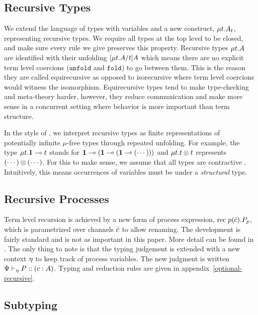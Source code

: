 \documentclass[a4paper,USenglish]{lipics-v2016}
\begin{document}
\subsection{Recursive Types}

We extend the language of types with variables and a new construct, $\mu{t} . {A_t}$, representing recursive types. We require all types at the top level to be closed, and make sure every rule we give preserves this property. Recursive types $\mu{t} . {A}$ are identified with their unfolding $\lbrack{\mu{t} . {A}}/{t}\rbrack{A}$ which means there are no explicit term level coercions ($\mathtt{unfold}$ and $\mathtt{fold}$) to go between them. This is the reason they are called equirecursive as opposed to isorecursive where term level coercions would witness the isomorphism. Equirecursive types tend to make type-checking and meta-theory harder, however, they reduce communication and make more sense in a concurrent setting where behavior is more important than term structure.

In the style of \cite{AmadioC91}, we interpret recursive types as finite representations of potentially infinite $\mu$-free types through repeated unfolding. For example, the type $\mu{t} . {\mathbf{1} \multimap t}$ stands for $\mathbf{1} \multimap (\mathbf{1} \multimap (\mathbf{1} \multimap (\cdots )))$ and $\mu{t} . {t \otimes t}$ represents $(\cdots) \otimes (\cdots)$. For this to make sense, we assume that all types are contractive \cite{StoneS2005, GayH05}. Intuitively, this means occurrences of variables must be under a \emph{structural} type.


\subsection{Recursive Processes}

Term level recursion is achieved by a new form of process expression, $\mathrm{rec}\; {p}(\bar{c}) . {P}_p$, which is parametrized over channels $\bar{c}$ to allow renaming. The development is fairly standard and is not as important in this paper. More detail can be found in \cite{ToninhoCP14}. The only thing to note is that the typing judgement is extended with a new context $\eta$ to keep track of process variables. The new judgment is written ${\Psi} \vdash_{\eta} P :: (c : A)$. Typing and reduction rules are given in appendix~\ref{optional-recursive}.


\subsection{Subtyping}
\label{original-subtyping}
\end{document}
